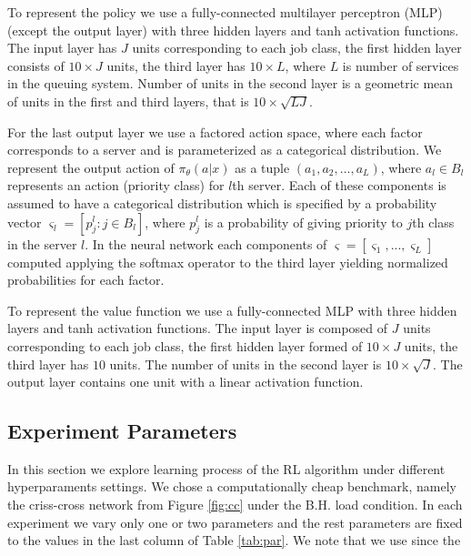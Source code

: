 \documentclass[11pt]{article}
\theoremstyle{definition}
\numberwithin{equation}{section}
\begin{document}
To represent the policy we use a fully-connected multilayer perceptron (MLP) (except the output layer) with three hidden layers and tanh activation functions. The input layer has $J$ units corresponding to each job class, the first hidden layer consists of $10\times J$ units, the third layer has $10\times L$, where $L$ is  number of services in the queuing system. Number of units in the  second layer is a geometric mean of units in the first and third layers, that is $10\times \sqrt{LJ}$.


For the last output layer we use a factored action space, where each factor corresponds to a server and is parameterized as a categorical distribution.
We represent the output action of $\pi_\theta(a|x)$ as a tuple $(a_1, a_2, . . . , a_L)$, where $a_l\in B_l$ represents an action (priority class) for $l$th server.
Each of these components is assumed to have a categorical distribution which is specified by a probability vector $\varsigma_l = [p_j^l: j\in B_l]$, where $p_j^l$ is a probability of giving priority to $j$th class in the server $l$. In the neural network each components of $\varsigma = [\varsigma_1, ..., \varsigma_L]$ computed applying the softmax operator to the third layer yielding normalized probabilities for each factor.


To represent the value function we use a fully-connected MLP with three hidden layers and tanh activation functions. The input layer is composed of $J$ units corresponding to each job class, the first hidden layer formed of $10\times J$ units, the third layer has $10$ units. The number of units in the  second layer is $10\times \sqrt{J}$. The output layer contains one unit with a linear activation function.

\subsection{Experiment Parameters}\label{sec:par}
In this section we explore learning process of the RL algorithm under different hyperparaments settings. We chose a computationally cheap benchmark, namely the criss-cross network from Figure \ref{fig:cc} under the B.H. load condition. In each experiment we vary only one or two parameters and the rest parameters  are fixed to the values in the last column of Table \ref{tab:par}. We note that we use since the
\end{document}
